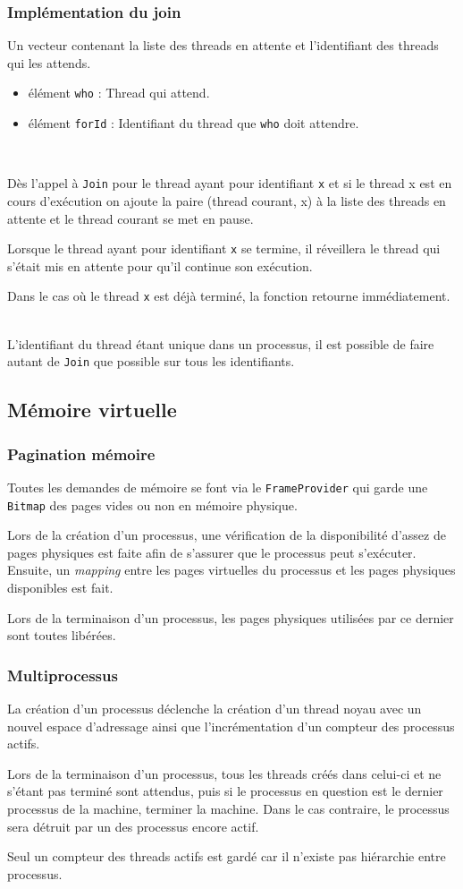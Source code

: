 \documentclass{article}
\begin{document}
		\subsubsection{Implémentation du join}
			Un vecteur contenant la liste des threads en attente et l'identifiant des threads qui les attends.
				\begin{itemize}
					\item élément \texttt{who} : Thread qui attend.
					\item élément \texttt{forId} : Identifiant du thread que \texttt{who} doit attendre.
				\end{itemize}
			~\par{Dès l'appel à \texttt{Join} pour le thread ayant pour identifiant \texttt{x} et si le thread x est en cours d’exécution on ajoute la paire (thread courant, x) à la liste des threads en attente et le thread courant se met en pause. 
			~\par{Lorsque le thread ayant pour identifiant \texttt{x} se termine, il réveillera le thread qui s'était mis en attente pour qu'il continue son exécution.}
			~\par{Dans le cas où le thread \texttt{x} est déjà terminé, la fonction retourne immédiatement.}
			~\par{L’identifiant du thread étant unique dans un processus, il est possible de faire autant de \texttt{Join} que possible sur tous les identifiants.}

	\subsection{Mémoire virtuelle}
		\subsubsection{Pagination mémoire}
			{Toutes les demandes de mémoire se font via le \texttt{FrameProvider} qui garde une \texttt{Bitmap} des pages vides ou non en mémoire physique.}
			~\par{Lors de la création d'un processus, une vérification de la disponibilité d'assez de pages physiques est faite afin de s'assurer que le processus peut s'exécuter. Ensuite, un \emph{mapping} entre les pages virtuelles du processus et les pages physiques disponibles est fait.}
			~\par{Lors de la terminaison d'un processus, les pages physiques utilisées par ce dernier sont toutes libérées.}
		\subsubsection{Multiprocessus}
			{La création d'un processus déclenche la création d'un thread noyau avec un nouvel espace d'adressage ainsi que l'incrémentation d'un compteur des processus actifs.}
			~\par{Lors de la terminaison d'un processus, tous les threads créés dans celui-ci et ne s'étant pas terminé sont attendus, puis si le processus en question est le dernier processus de la machine, terminer la machine. Dans le cas contraire, le processus sera détruit par un des processus encore actif.}
			~\par{Seul un compteur des threads actifs est gardé car il n'existe pas hiérarchie entre processus.}
}
\end{document}
